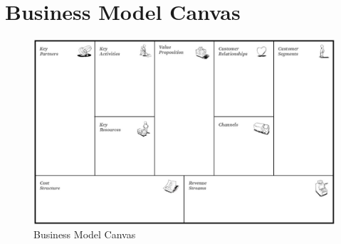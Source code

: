 \chapter{Business Model Canvas}\label{ch:app02}

\begin{figure}[htb]
	\centering
	\includegraphics[width=\textwidth]{gfx/businessModelCanvas}
	\caption[Business Model Canvas]{Business Model Canvas \citep[p. 44]{Osterwalder2010}}
	\label{fig:bmc}
\end{figure}